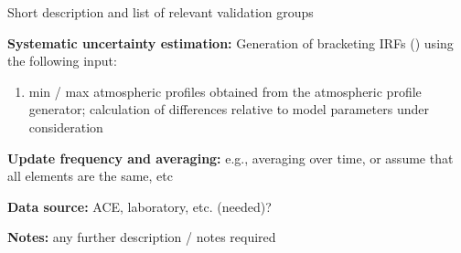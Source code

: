 Short description and list of relevant validation groups 

\textbf{Systematic uncertainty estimation:}
Generation of bracketing IRFs () using the following input:
\begin{enumerate}
    \item min / max atmospheric profiles obtained from the atmospheric profile generator; calculation of differences relative to model parameters under consideration
\end{enumerate}

\textbf{Update frequency and averaging:}
e.g., averaging over time, or assume that all elements are the same, etc

\textbf{Data source:}
ACE, laboratory, etc. (needed)?

\textbf{Notes:}
 any further description / notes required
